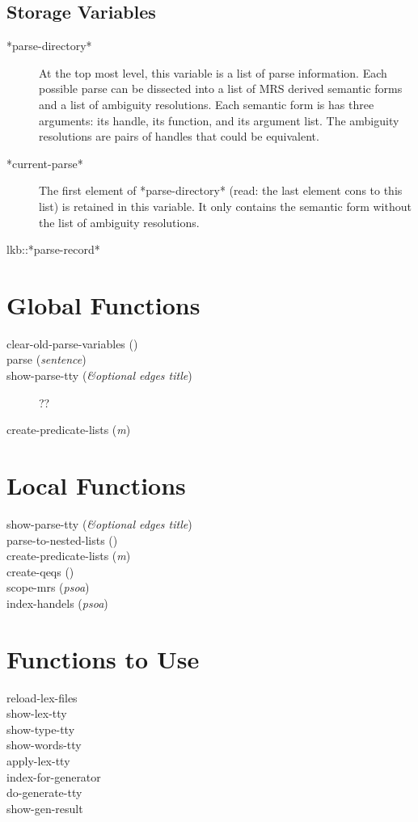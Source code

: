 \documentclass{article}
\begin{document}
\subsection{Storage Variables}

  \begin{description}
    \item[*parse-directory*] At the top most level, this variable is a list of parse information. Each possible parse can be dissected into a list of MRS derived semantic forms and a list of ambiguity resolutions. Each semantic form is has three arguments: its handle, its function, and its argument list. The ambiguity resolutions are pairs of handles that could be equivalent.
    \item[*current-parse*] The first element of *parse-directory* (read:  the last element cons to this list) is retained in this variable.  It only contains the semantic form without the list of ambiguity resolutions.
    \item[lkb::*parse-record*]
  \end{description}

\section{Global Functions}

  \begin{description}
    \item[clear-old-parse-variables ()]
    \item[parse (\textsl{sentence})]
    \item[show-parse-tty (\textsl{\&optional edges title})] ??
    \item[create-predicate-lists (\textsl{m})]
  \end{description}

\section{Local Functions}

  \begin{description}
    \item[show-parse-tty (\textsl{\&optional edges title})]
    \item[parse-to-nested-lists ()]
    \item[create-predicate-lists (\textsl{m})]
    \item[create-qeqs ()]
    \item[scope-mrs (\textsl{psoa})]
    \item[index-handels (\textsl{psoa})]
  \end{description}

\section{Functions to Use}

  \begin{description}
    \item[reload-lex-files]
    \item[show-lex-tty]
    \item[show-type-tty]
    \item[show-words-tty]
    \item[apply-lex-tty]
    \item[index-for-generator]
    \item[do-generate-tty]
    \item[show-gen-result]
  \end{description}
\end{document}
